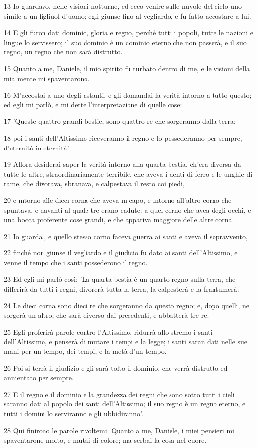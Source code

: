 \par 13 Io guardavo, nelle visioni notturne, ed ecco venire sulle nuvole del cielo uno simile a un figliuol d'uomo; egli giunse fino al vegliardo, e fu fatto accostare a lui.
\par 14 E gli furon dati dominio, gloria e regno, perché tutti i popoli, tutte le nazioni e lingue lo servissero; il suo dominio è un dominio eterno che non passerà, e il suo regno, un regno che non sarà distrutto.
\par 15 Quanto a me, Daniele, il mio spirito fu turbato dentro di me, e le visioni della mia mente mi spaventarono.
\par 16 M'accostai a uno degli astanti, e gli domandai la verità intorno a tutto questo; ed egli mi parlò, e mi dette l'interpretazione di quelle cose:
\par 17 'Queste quattro grandi bestie, sono quattro re che sorgeranno dalla terra;
\par 18 poi i santi dell'Altissimo riceveranno il regno e lo possederanno per sempre, d'eternità in eternità'.
\par 19 Allora desiderai saper la verità intorno alla quarta bestia, ch'era diversa da tutte le altre, straordinariamente terribile, che aveva i denti di ferro e le unghie di rame, che divorava, sbranava, e calpestava il resto coi piedi,
\par 20 e intorno alle dieci corna che aveva in capo, e intorno all'altro corno che spuntava, e davanti al quale tre erano cadute: a quel corno che avea degli occhi, e una bocca proferente cose grandi, e che appariva maggiore delle altre corna.
\par 21 Io guardai, e quello stesso corno faceva guerra ai santi e aveva il sopravvento,
\par 22 finché non giunse il vegliardo e il giudicio fu dato ai santi dell'Altissimo, e venne il tempo che i santi possederono il regno.
\par 23 Ed egli mi parlò così: 'La quarta bestia è un quarto regno sulla terra, che differirà da tutti i regni, divorerà tutta la terra, la calpesterà e la frantumerà.
\par 24 Le dieci corna sono dieci re che sorgeranno da questo regno; e, dopo quelli, ne sorgerà un altro, che sarà diverso dai precedenti, e abbatterà tre re.
\par 25 Egli proferirà parole contro l'Altissimo, ridurrà allo stremo i santi dell'Altissimo, e penserà di mutare i tempi e la legge; i santi saran dati nelle sue mani per un tempo, dei tempi, e la metà d'un tempo.
\par 26 Poi si terrà il giudizio e gli sarà tolto il dominio, che verrà distrutto ed annientato per sempre.
\par 27 E il regno e il dominio e la grandezza dei regni che sono sotto tutti i cieli saranno dati al popolo dei santi dell'Altissimo; il suo regno è un regno eterno, e tutti i domini lo serviranno e gli ubbidiranno'.
\par 28 Qui finirono le parole rivoltemi. Quanto a me, Daniele, i miei pensieri mi spaventarono molto, e mutai di colore; ma serbai la cosa nel cuore.

